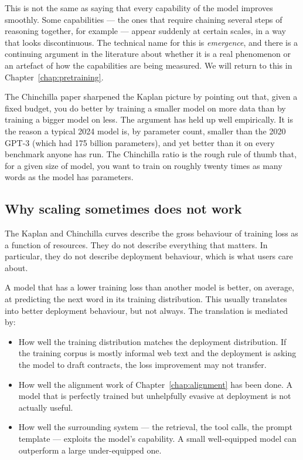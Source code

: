 This is not the same as saying that every capability of the
model improves smoothly. Some capabilities --- the ones that
require chaining several steps of reasoning together, for
example --- appear suddenly at certain scales, in a way that
looks discontinuous. The technical name for this is
\emph{emergence}, and there is a continuing argument in the
literature about whether it is a real phenomenon or an artefact
of how the capabilities are being measured. We will return to
this in Chapter~\ref{chap:pretraining}.

The Chinchilla paper sharpened the Kaplan picture by pointing
out that, given a fixed budget, you do better by training a
smaller model on more data than by training a bigger model on
less. The argument has held up well empirically. It is the
reason a typical 2024 model is, by parameter count, smaller
than the 2020 GPT-3 (which had 175 billion parameters), and yet
better than it on every benchmark anyone has run. The Chinchilla
ratio is the rough rule of thumb that, for a given size of
model, you want to train on roughly twenty times as many words
as the model has parameters.

\subsection*{Why scaling sometimes does not work}

The Kaplan and Chinchilla curves describe the gross behaviour
of training loss as a function of resources. They do not
describe everything that matters. In particular, they do not
describe deployment behaviour, which is what users care about.

A model that has a lower training loss than another model is
better, on average, at predicting the next word in its training
distribution. This usually translates into better deployment
behaviour, but not always. The translation is mediated by:

\begin{itemize}
  \item How well the training distribution matches the
        deployment distribution. If the training corpus is
        mostly informal web text and the deployment is asking
        the model to draft contracts, the loss improvement may
        not transfer.
  \item How well the alignment work of Chapter~\ref{chap:alignment} has been done.
        A model that is perfectly trained but unhelpfully
        evasive at deployment is not actually useful.
  \item How well the surrounding system --- the retrieval, the
        tool calls, the prompt template --- exploits the model's
        capability. A small well-equipped model can outperform
        a large under-equipped one.
\end{itemize}

